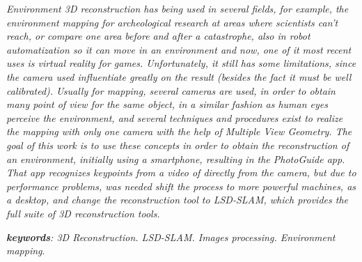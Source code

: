 \setlength{\absparsep}{18pt} %
\begin{resumo}[Abstract]
\textit{Environment 3D reconstruction has being used in several fields, for example, the environment mapping for archeological research at areas where scientists can't reach, or compare one area before and after a catastrophe\cite{SLAMAP}, also in robot automatization so it can move in an environment and now, one of it most recent uses is virtual reality for games. Unfortunately, it still has some limitations, since the camera used influentiate greatly on the result (besides the fact it must be well calibrated). Usually for mapping, several cameras are used, in order to obtain many point of view for the same object, in a similar fashion as human eyes perceive the environment, and several techniques and procedures exist to realize the mapping with only one camera with the help of Multiple View Geometry. The goal of this work is to use these concepts in order to obtain the reconstruction of an environment, initially using a smartphone, resulting in the PhotoGuide app. That app recognizes keypoints from a video of directly from the camera, but due to performance problems, was needed shift the process to more powerful machines, as a desktop, and change the reconstruction tool to LSD-SLAM, which provides the full suite of 3D reconstruction tools.}


\textit{\textbf{keywords}: 3D Reconstruction. LSD-SLAM. Images processing. Environment mapping}.
\end{resumo}